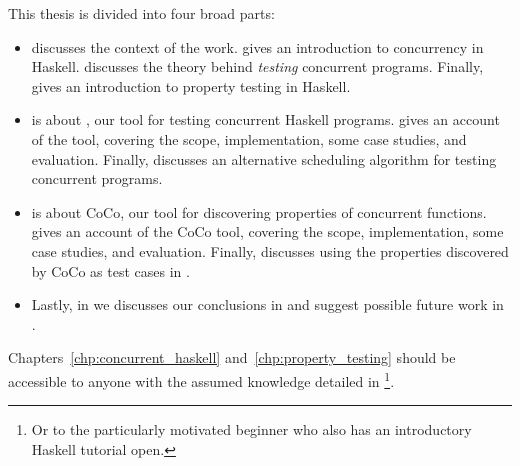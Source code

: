 This thesis is divided into four broad parts:

\begin{itemize}
\item {} discusses the context of the work.
   gives an introduction to concurrency in Haskell.
   discusses the theory behind \emph{testing} concurrent programs.
  Finally,  gives an introduction to property testing
  in Haskell.

\item {} is about \dejafu{}, our tool for testing concurrent
  Haskell programs.   gives an account of the \dejafu{} tool,
  covering the scope, implementation, some case studies, and evaluation.
  Finally,  discusses an alternative scheduling algorithm for
  testing concurrent programs.

\item {} is about CoCo, our tool for discovering properties of
  concurrent functions.   gives an account of the CoCo tool,
  covering the scope, implementation, some case studies, and evaluation.
  Finally,  discusses using the properties discovered by
  CoCo as test cases in \dejafu{}.

\item Lastly, in  we discusses our conclusions in
   and suggest possible future work in .
\end{itemize}

Chapters~\ref{chp:concurrent_haskell} and~\ref{chp:property_testing} should be
accessible to anyone with the assumed knowledge detailed in
\footnote{Or to the particularly motivated beginner who also has
  an introductory Haskell tutorial open.}.
